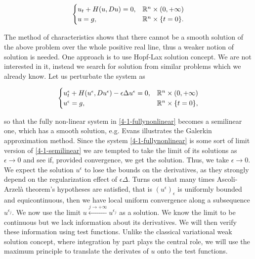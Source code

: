 \begin{equation}\label{4-1-fullynonlinear}
    \begin{cases}
        u_t + H(u,Du) = 0,& \mathbb{R}^n\times(0,+\infty) \\
        u = g,& \mathbb{R}^n\times\{t=0\}.
    \end{cases}
\end{equation}

The method of characteristics shows that there cannot be a smooth solution of the above problem over the whole positive 
real line, thus a weaker notion of solution is needed. One approach is to use Hopf-Lax solution concept. We are not 
interested in it, instead we search for solution from similar problems which we already know. Let us perturbate the system as

\begin{equation}\label{4-1-semilinear}
    \begin{cases}
        u^{\epsilon}_t + H(u^{\epsilon},Du^{\epsilon}) -\epsilon\Delta u^{\epsilon}= 0,& \mathbb{R}^n\times(0,+\infty) \\
        u^{\epsilon} = g,& \mathbb{R}^n\times\{t=0\},
    \end{cases}
\end{equation}

so that the fully non-linear system in \ref{4-1-fullynonlinear} becomes a semilinear one, which has a smooth solution, e.g. Evans\cite{evans10} illustrates the Galerkin approximation method. Since the system \eqref{4-1-fullynonlinear} is some sort of limit version of \eqref{4-1-semilinear} we are tempted to take the limit of its solutions as $\epsilon\to 0$ and see if, provided convergence, we get the solution.  
Thus, we take $\epsilon\to0$. We expect the solution $u^{\epsilon}$ to lose the bounds on the derivatives, as they strongly depend on the 
regularization effect of $\epsilon\Delta$. Turns out that many times Ascoli-Arzelà theorem's hypotheses are satisfied, that is $(u^{\epsilon})_{\epsilon}$ 
is uniformly bounded and equicontinuous, then we have local uniform convergence along a subsequence $u^{\epsilon_j}$. We now use the limit
$u\xleftarrow{j\to+\infty}u^{\epsilon_j}$ as a solution. 
We know the limit to be continuous but we lack information about its derivatives. We will then verify these information using test functions. 
Unlike the classical variational weak solution concept, where integration by part plays the central role, we will use the maximum principle 
to translate the derivates of $u$ onto the test functions. 


